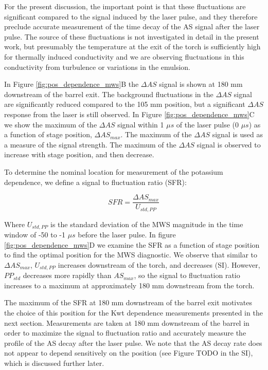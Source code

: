 For the present discussion, the important point is that these fluctuations are significant compared to the signal induced by the laser pulse, and they therefore preclude accurate measurement of the time decay of the AS signal after the laser pulse. The source of these fluctuations is not investigated in detail in the present work, but presumably the temperature at the exit of the torch is sufficiently high for thermally induced conductivity and we are observing fluctuations in this conductivity from turbulence or variations in the emulsion.

In Figure \ref{fig:pos_dependence_mws}B the $\Delta AS$ signal is shown at 180 mm downstream of the barrel exit. The background fluctuations in the $\Delta AS$ signal are significantly reduced compared to the 105 mm position, but a significant $\Delta AS$ response from the laser is still observed. In Figure \ref{fig:pos_dependence_mws}C we show the maximum of the $\Delta AS$ signal within 1 $\mu s$ of the laser pulse (0 $\mu s$) as a function of stage position, $\Delta AS_{max}$. The maximum of the $\Delta AS$ signal is used as a measure of the signal strength. The maximum of the $\Delta AS$ signal is observed to increase with stage position, and then decrease.

To determine the nominal location for measurement of the potassium dependence, we define a signal to fluctuation ratio (SFR): 

\begin{equation}
    \label{eq:sfr}
    SFR = \frac{\Delta AS_{max}}{U_{std,PP}}
\end{equation}

Where $U_{std,PP}$ is the standard deviation of the MWS magnitude in the time window of -50 to -1 $\mu s$ before the laser pulse.  In figure \ref{fig:pos_dependence_mws}D we examine the SFR as a function of stage position to find the optimal position for the MWS diagnostic. We observe that similar to $\Delta AS_{max}$, $U_{std,PP}$ increases downstream of the torch, and decreases (SI). However, $PP_{std}$ decreases more rapidly than $AS_{max}$, so the signal to fluctuation ratio increases to a maximum at approximately 180 mm downstream from the torch. 

The maximum of the SFR at 180 mm downstream of the barrel exit motivates the choice of this position for the Kwt dependence measurements presented in the next section. Measurements are taken at 180 mm downstream of the barrel in order to maximize the signal to fluctuation ratio and accurately measure the profile of the AS decay after the laser pulse. We note that the AS decay rate does not appear to depend sensitively on the position (see Figure TODO in the SI), which is discussed further later. 


